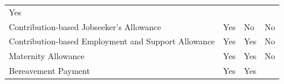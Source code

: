 \documentclass[]{tufte-handout}
\begin{document}
\begin{longtable}[]{@{}llll@{}}
\begin{minipage}[t]{0.24\columnwidth}
Yes\strut
\end{minipage}\tabularnewline
\begin{minipage}[t]{0.33\columnwidth}\raggedright
Contribution-based Jobseeker's Allowance\strut
\end{minipage} & \begin{minipage}[t]{0.15\columnwidth}\raggedright
Yes\strut
\end{minipage} & \begin{minipage}[t]{0.17\columnwidth}\raggedright
No\strut
\end{minipage} & \begin{minipage}[t]{0.24\columnwidth}\raggedright
No\strut
\end{minipage}\tabularnewline
\begin{minipage}[t]{0.33\columnwidth}\raggedright
Contribution-based Employment and Support Allowance\strut
\end{minipage} & \begin{minipage}[t]{0.15\columnwidth}\raggedright
Yes\strut
\end{minipage} & \begin{minipage}[t]{0.17\columnwidth}\raggedright
Yes\strut
\end{minipage} & \begin{minipage}[t]{0.24\columnwidth}\raggedright
No\strut
\end{minipage}\tabularnewline
\begin{minipage}[t]{0.33\columnwidth}\raggedright
Maternity Allowance\strut
\end{minipage} & \begin{minipage}[t]{0.15\columnwidth}\raggedright
Yes\strut
\end{minipage} & \begin{minipage}[t]{0.17\columnwidth}\raggedright
Yes\strut
\end{minipage} & \begin{minipage}[t]{0.24\columnwidth}\raggedright
No\strut
\end{minipage}\tabularnewline
\begin{minipage}[t]{0.33\columnwidth}\raggedright
Bereavement Payment\strut
\end{minipage} & \begin{minipage}[t]{0.15\columnwidth}\raggedright
Yes\strut
\end{minipage} & \begin{minipage}[t]{0.17\columnwidth}\raggedright
Yes\strut
\end{minipage} & \begin{minipage}[t]{0.24\columnwidth}\raggedright

\end{minipage}
\end{longtable}
\end{document}
